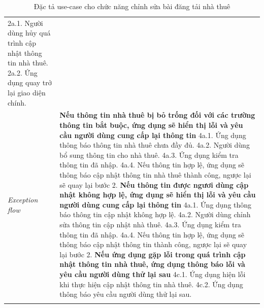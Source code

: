 \begin{center}
\begin{longtable}{
        |>{\raggedright\arraybackslash}p{3cm}
        |>{\raggedright\arraybackslash}p{13cm}
        |}
        2a.1. Người dùng hủy quá trình cập nhật thông tin nhà thuê. \newline
        2a.2. Ứng dụng quay trở lại giao diện chính.
        \\\hdashline
        \rowcolor{cyan!10!white} \textit{Exception flow} & 
        \textbf{Nếu thông tin nhà thuê bị bỏ trống đối với các trường thông tin bắt buộc, ứng dụng sẽ hiển thị lỗi và yêu cầu người dùng cung cấp lại thông tin} \newline
        4a.1. Ứng dụng thông báo thông tin nhà thuê chưa đầy đủ. \newline
        4a.2. Người dùng bổ sung thông tin cho nhà thuê. \newline
        4a.3. Ứng dụng kiểm tra thông tin đã nhập. \newline
        4a.4. Nếu thông tin hợp lệ, ứng dụng sẽ thông báo cập nhật thông tin nhà thuê thành công, ngược lại sẽ quay lại bước 2. \newline
        \textbf{Nếu thông tin được ngươi dùng cập nhật không hợp lệ, ứng dụng sẽ hiển thị lỗi và yêu cầu người dùng cung cấp lại thông tin} \newline
        4a.1. Ứng dụng thông báo thông tin cập nhật không hợp lệ. \newline
        4a.2. Người dùng chỉnh sửa thông tin cập nhật nhà thuê. \newline
        4a.3. Ứng dụng kiểm tra thông tin đã nhập. \newline
        4a.4. Nếu thông tin hợp lệ, ứng dụng sẽ thông báo cập nhật thông tin thành công, ngược lại sẽ quay lại bước 2. \newline
        \textbf{Nếu ứng dụng gặp lỗi trong quá trình cập nhật thông tin nhà thuê, ứng dụng thông báo lỗi và yêu cầu người dùng thử lại sau} \newline
        4c.1. Ứng dụng hiện lỗi khi thực hiện cập nhật thông tin nhà thuê. \newline
        4c.2. Ứng dụng thông báo yêu cầu người dùng thử lại sau.
        \\\hline
        \caption{Đặc tả use-case cho chức năng chỉnh sửa bài đăng tải nhà thuê}
    \end{longtable}
\end{center}
